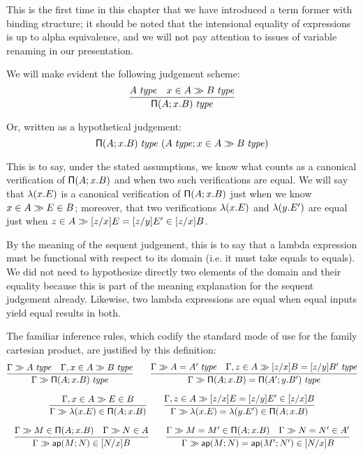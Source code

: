 \documentclass[main.tex]{subfiles}
\begin{document}
This is the first time in this chapter that we have introduced a term former
with binding structure; it should be noted that the intensional equality of
expressions is up to alpha equivalence, and we will not pay attention to issues
of variable renaming in our presentation.

We will make evident the following judgement scheme:
\[
  \infer{
    \isset{\typrod{A}{x}{B}}
  }{
    \isset{A} &
    \sequent{\ver{x}{A}}{\isset{B}}
  }
\]

Or, written as a hypothetical judgement:
\[
  \mathsf{\Pi}(A;x.B)\;\mathit{type}\ (A\;\mathit{type};x\in A\gg B\;\mathit{type})
\]

This is to say, under the stated assumptions, we know what counts as a
canonical verification of $\mathsf{\Pi}(A;x.B)$ and when two such
verifications are equal. We will say that $\mathsf{\lambda}(x.E)$ is a canonical
verification of $\mathsf{\Pi}(A;x.B)$ just when we know
$x\in A\gg E\in B$; moreover, that two verifications
$\mathsf{\lambda}(x.E)$ and $\mathsf{\lambda}(y.E')$ are equal just when
$z\in A\gg[z/x]E=[z/y]E'\in[z/x]B$.

By the meaning of the sequent judgement, this is to say that a lambda
expression must be functional with respect to its domain (i.e. it must take
equals to equals). We did not need to hypothesize directly two elements of the
domain and their equality because this is part of the meaning explanation for
the sequent judgement already. Likewise, two lambda expressions are equal when
equal inputs yield equal results in both.

The familiar inference rules, which codify the standard mode of use for the
family cartesian product, are justified by this definition:
\begin{gather*}
  \infer{
    \sequent\Gamma\isset{\typrod{A}{x}{B}}
  }{
    \sequent\Gamma\isset{A} &
    \sequent{\Gamma,\ver{x}{A}}{\isset{B}}
  }\qquad
  \infer{
    \sequent\Gamma\isset{\typrod{A}{x}{B}=\typrod{A'}{y}{B'}}
  }{
   \sequent\Gamma\isset{A=A'} &
    \sequent{\Gamma,\ver{z}{A}}{\isset{[z/x]B=[z/y]B'}}
  }\\[6pt]
  \infer{
    \sequent\Gamma\ver{\lam{x}{E}}{\typrod{A}{x}{B}}
  }{
    \sequent{\Gamma,\ver{x}{A}}{\ver{E}{B}}
  }\qquad
  \infer{
    \sequent\Gamma\ver{\lam{x}{E}=\lam{y}{E'}}{\typrod{A}{x}{B}}
  }{
    \sequent{\Gamma,\ver{z}{A}}{\ver{[z/x]E=[z/y]E'}{[z/x]B}}
  }\\[6pt]
  \infer{
    \sequent\Gamma\ver{\ap{M}{N}}{[N/x]B}
  }{
    \sequent\Gamma\ver{M}{\typrod{A}{x}{B}} &
    \sequent\Gamma\ver{N}{A}
  }\qquad
  \infer{
    \sequent\Gamma\ver{\ap{M}{N}=\ap{M'}{N'}}{[N/x]B}
  }{
    \sequent\Gamma\ver{M=M'}{\typrod{A}{x}{B}} &
    \sequent\Gamma\ver{N=N'}{A'}
  }
\end{gather*}
\end{document}
